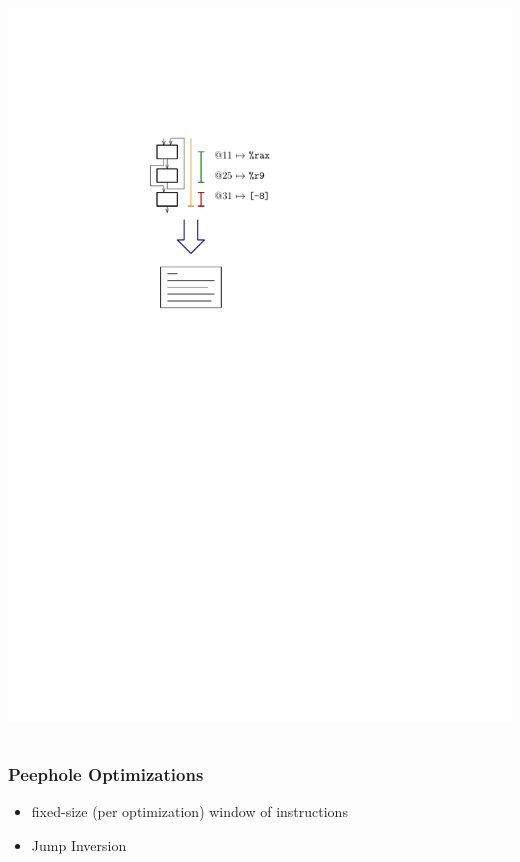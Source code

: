 \documentclass[navbaroff,en]{sdqbeamer}
\begin{document}
\begin{frame}
\begin{columns}
	\begin{column}{0.3\textwidth}
		\centering \includegraphics[scale=0.7]{images/code_generation.pdf}
	\end{column}
\end{columns}
\end{frame}

\begin{frame}
    \frametitle{Peephole Optimizations}

    \begin{itemize}
        \item fixed-size (per optimization) window of instructions
        \vspace{1em}
        \item Jump Inversion
    \end{itemize}

\end{frame}
\end{document}
